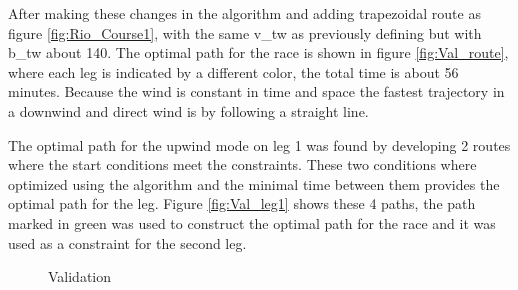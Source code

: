 After making these changes in the algorithm and adding trapezoidal route as figure \ref{fig:Rio_Course1}, with the same \acrshort{v_tw} as previously defining but with \acrshort{b_tw} about 140\degree. The optimal path for the race is shown in figure \ref{fig:Val_route}, where each leg is indicated by a different color, the total time is about 56 minutes. Because the wind is constant in time and space the fastest trajectory in a downwind and direct wind is by following a straight line. \par \noindent 
The optimal path for the upwind mode on leg 1 was found by developing 2 routes where the start conditions meet the constraints.  These two conditions where optimized using the algorithm and the minimal time between them provides the optimal path for the leg. Figure \ref{fig:Val_leg1} shows these 4 paths, the path marked in green was used to construct the optimal path for the race and it was used as a constraint for the second leg. \par 

\begin{figure} [hbt!]
  \centering
  \hfill

  \caption{Validation} %
\label{fig:Val_algorithm_Route}
\end{figure}

